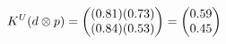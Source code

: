 \documentclass[preview]{standalone}
\begin{document}
\begin{align*}
\special{dvisvgm:raw <g id='unique000'>}K^U(d \otimes p) = \begin{pmatrix} (0.81)(0.73) \\ (0.84)(0.53) \end{pmatrix} = \begin{pmatrix} 0.59 \\ 0.45 \end{pmatrix}\special{dvisvgm:raw </g>}
\end{align*}
\end{document}

